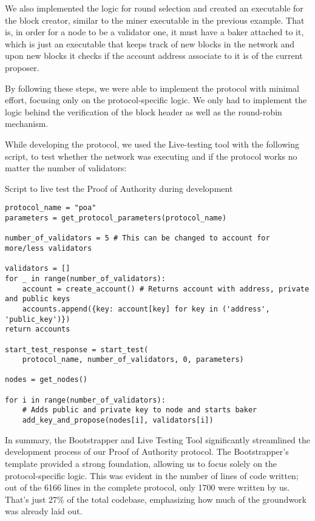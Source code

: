 We also implemented the logic for round selection and created an executable for the block creator, similar to the miner executable in the previous example. That is, in order for a node to be a validator one, it must have a baker attached to it, which is just an executable that keeps track of new blocks in the network and upon new blocks it checks if the account address associate to it is of the current proposer.

By following these steps, we were able to implement the protocol with minimal effort, focusing only on the protocol-specific logic. We only had to implement the logic behind the verification of the block header as well as the round-robin  mechanism.

While developing the protocol, we used the Live-testing tool with the following script, to test whether the network was executing and if the protocol works no matter the number of validators:

\begin{listing}[H]
\caption{Script to live test the Proof of Authority during development}
\label{lst:python_code}
\begin{verbatim}
protocol_name = "poa"
parameters = get_protocol_parameters(protocol_name)

number_of_validators = 5 # This can be changed to account for more/less validators

validators = []
for _ in range(number_of_validators):
    account = create_account() # Returns account with address, private and public keys
    accounts.append({key: account[key] for key in ('address', 'public_key')})
return accounts

start_test_response = start_test(
    protocol_name, number_of_validators, 0, parameters)

nodes = get_nodes() 

for i in range(number_of_validators):
    # Adds public and private key to node and starts baker
    add_key_and_propose(nodes[i], validators[i])
\end{verbatim}
\end{listing}



In summary, the Bootstrapper and Live Testing Tool significantly streamlined the development process of our Proof of Authority protocol. The Bootstrapper's template provided a strong foundation, allowing us to focus solely on the protocol-specific logic. This was evident in the number of lines of code written; out of the 6166 lines in the complete protocol, only 1700 were written by us. That's just 27\% of the total codebase, emphasizing how much of the groundwork was already laid out. 

